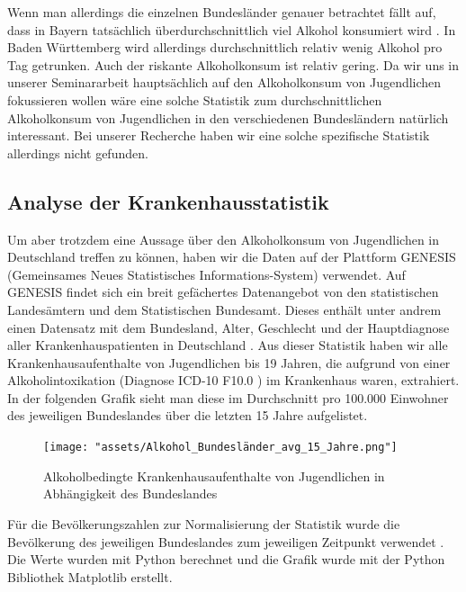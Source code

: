 \documentclass[12pt]{article}
\begin{document}
Wenn man allerdings die einzelnen Bundesländer genauer betrachtet fällt auf, dass in Bayern tatsächlich überdurchschnittlich viel Alkohol konsumiert wird \autocite[778]{kraus_einfluss_2001}. In Baden Württemberg wird allerdings durchschnittlich relativ wenig Alkohol pro Tag getrunken. Auch der riskante Alkoholkonsum ist relativ gering. Da wir uns in unserer Seminararbeit hauptsächlich auf den Alkoholkonsum von Jugendlichen fokussieren wollen wäre eine solche Statistik zum durchschnittlichen Alkoholkonsum von Jugendlichen in den verschiedenen Bundesländern natürlich interessant. Bei unserer Recherche haben wir eine solche spezifische Statistik allerdings nicht gefunden.\\
\subsection{Analyse der Krankenhausstatistik}

Um aber trotzdem eine Aussage über den Alkoholkonsum von Jugendlichen in Deutschland treffen zu können, haben wir die Daten auf der Plattform GENESIS (Gemeinsames Neues Statistisches Informations-System) \autocite{noauthor_statistisches_nodate} verwendet. Auf GENESIS findet sich ein breit gefächertes Datenangebot von den statistischen Landesämtern und dem Statistischen Bundesamt. Dieses enthält unter andrem einen Datensatz mit dem Bundesland, Alter, Geschlecht und der Hauptdiagnose aller Krankenhauspatienten in Deutschland \autocite{noauthor_genesis_nodate}. Aus dieser Statistik haben wir alle Krankenhausaufenthalte von Jugendlichen bis 19 Jahren, die aufgrund von einer Alkoholintoxikation (Diagnose ICD-10 F10.0 \autocite{noauthor_icd-10-code_nodate}) im Krankenhaus waren, extrahiert. In der folgenden Grafik sieht man diese im Durchschnitt pro 100.000 Einwohner des jeweiligen Bundeslandes über die letzten 15 Jahre aufgelistet.

\begin{figure}[H]
    \centering
    \texttt{[image: "assets/Alkohol\_Bundesländer\_avg\_15\_Jahre.png"]}
    \caption{Alkoholbedingte Krankenhausaufenthalte von Jugendlichen in Abhängigkeit des Bundeslandes}
    \label{fig:Krankenhausaufenthalte_1}
\end{figure}

Für die Bevölkerungszahlen zur Normalisierung der Statistik wurde die Bevölkerung des jeweiligen Bundeslandes zum jeweiligen Zeitpunkt verwendet \autocite{noauthor_statistisches_2024}. Die Werte wurden mit Python berechnet und die Grafik wurde mit der Python Bibliothek Matplotlib \autocite{noauthor_matplotlib_nodate} erstellt. 
\end{document}

